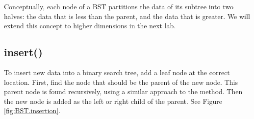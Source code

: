 \begin{info}
Conceptually, each node of a BST partitions the data of its subtree into two halves: the data that is less than the parent, and the data that is greater.
We will extend this concept to higher dimensions in the next lab.
\end{info}

\subsection*{insert()} %

To insert new data into a binary search tree, add a leaf node at the correct location.
First, find the node that should be the parent of the new node.
This parent node is found recursively, using a similar approach to the  method.
Then the new node is added as the left or right child of the parent.
See Figure \ref{fig:BST.insertion}.

